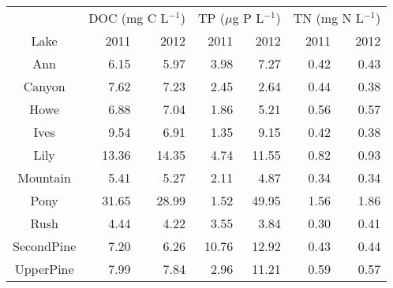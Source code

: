 \begin{table}[ht]
\centering
\begin{tabular}{crrrrrr}
  \hline
\hline
  & \multicolumn{2}{c}{DOC (mg C L$^{-1}$)} & 
                      \multicolumn{2}{c}{TP ($\mu$g P L$^{-1}$)} & 
                      \multicolumn{2}{c}{TN (mg N L$^{-1}$)}\\
 Lake & 2011 & 2012 & 2011 & 2012 & 2011 & 2012 \\
 \hline
Ann & 6.15 & 5.97 & 3.98 & 7.27 & 0.42 & 0.43 \\ 
  Canyon & 7.62 & 7.23 & 2.45 & 2.64 & 0.44 & 0.38 \\ 
  Howe & 6.88 & 7.04 & 1.86 & 5.21 & 0.56 & 0.57 \\ 
  Ives & 9.54 & 6.91 & 1.35 & 9.15 & 0.42 & 0.38 \\ 
  Lily & 13.36 & 14.35 & 4.74 & 11.55 & 0.82 & 0.93 \\ 
  Mountain & 5.41 & 5.27 & 2.11 & 4.87 & 0.34 & 0.34 \\ 
  Pony & 31.65 & 28.99 & 1.52 & 49.95 & 1.56 & 1.86 \\ 
  Rush & 4.44 & 4.22 & 3.55 & 3.84 & 0.30 & 0.41 \\ 
  SecondPine & 7.20 & 6.26 & 10.76 & 12.92 & 0.43 & 0.44 \\ 
  UpperPine & 7.99 & 7.84 & 2.96 & 11.21 & 0.59 & 0.57 \\ 
   \hline
\end{tabular}
\end{table}
